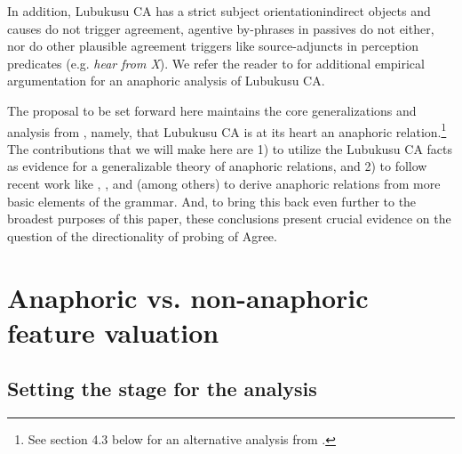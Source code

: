 \noindent In addition, Lubukusu CA has a strict subject orientation\textemdash indirect objects and causes do not trigger agreement, agentive by-phrases in passives do not either, nor do other plausible agreement triggers like source-adjuncts in perception predicates (e.g. \textit{hear from X}). We refer the reader to \citet{Diercks:2010,Diercks:2013} for additional empirical argumentation for an anaphoric analysis of Lubukusu CA.

The proposal to be set forward here maintains the core generalizations and analysis from \citet{Diercks:2013}, namely, that Lubukusu CA is at its heart an anaphoric relation.\footnote{See section 4.3 below for an alternative analysis from \citet{Carstens:2016}.} The contributions that we will make here are 1) to utilize the Lubukusu CA facts as evidence for a generalizable theory of anaphoric relations, and 2) to follow recent work like \citet{Hicks:2009}, \citet{Reuland:2005,Reuland:2011}, and \citet{Rooryck:2011} (among others) to derive anaphoric relations from more basic elements of the grammar. And, to bring this back even further to the broadest purposes of this paper, these conclusions present crucial evidence on the question of the directionality of probing of Agree. 

\section{Anaphoric vs. non-anaphoric feature valuation} \label{AnalysisSection}

\subsection{Setting the stage for the analysis}

